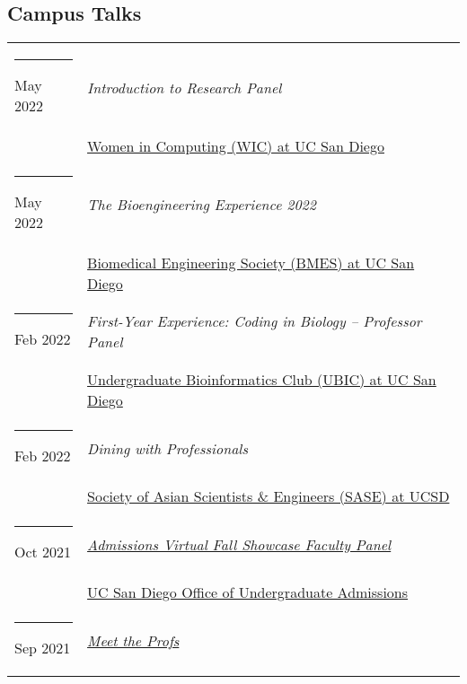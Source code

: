 \documentclass[margin,line]{res}
\begin{document}
\begin{resume}
\section{\sc Campus Talks}
\begin{longtable}{@{}p{0.7in}p{4in}}\rule{-1mm}{4.5mm}
\hspace*{-4mm} May 2022 & \textit{Introduction to Research Panel}\\*
\hspace*{-4mm} & \hspace{4mm} \href{http://wic.ucsd.edu/}{Women in Computing (WIC) at UC San Diego}\\
\hspace*{-4mm} \rule{-1mm}{5mm} May 2022 & \textit{The Bioengineering Experience 2022}\\*
\hspace*{-4mm} & \hspace{4mm} \href{http://bmes.ucsd.edu/}{Biomedical Engineering Society (BMES) at UC San Diego}\\
\hspace*{-4mm} \rule{-1mm}{5mm} Feb 2022 & \textit{First-Year Experience: Coding in Biology -- Professor Panel}\\*
\hspace*{-4mm} & \hspace{4mm} \href{https://ubicucsd.github.io/}{Undergraduate Bioinformatics Club (UBIC) at UC San Diego}\\
\hspace*{-4mm} \rule{-1mm}{5mm} Feb 2022 & \textit{Dining with Professionals}\\*
\hspace*{-4mm} & \hspace{4mm} \href{https://saseatucsd.weebly.com/}{Society of Asian Scientists \& Engineers (SASE) at UCSD}\\
\hspace*{-4mm} \rule{-1mm}{5mm} Oct 2021 & \href{https://beatriton.ucsd.edu/register/ucsdvirtualfallshowcase}{\textit{Admissions Virtual Fall Showcase Faculty Panel}}\\*
\hspace*{-4mm} & \hspace{4mm} \href{https://admissions.ucsd.edu/}{UC San Diego Office of Undergraduate Admissions}\\
\hspace*{-4mm} \rule{-1mm}{5mm} Sep 2021 & \href{https://www.facebook.com/events/610194613335437}{\textit{Meet the Profs}}\\*

\end{longtable}
\end{resume}
\end{document}
